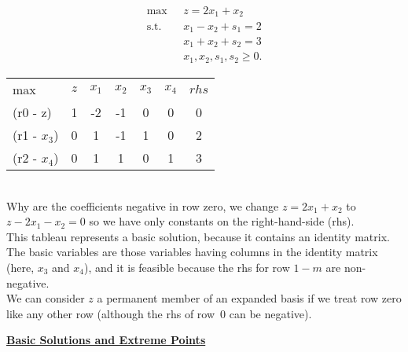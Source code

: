 \begin{minipage}[t][][b]{.4\linewidth} \vspace{-5mm}
\begin{align*}
\mbox{max~~} & z = 2x_1 + x_2  \\
\mbox{s.t.~~} & x_1 - x_2 +s_1 =  2  \\
& x_1 + x_2 +s_2  = 3 \\
& x_1, x_2, s_1 , s_2  \ge 0.
\end{align*}
\end{minipage}%
\begin{minipage}[t][][b]{.6\linewidth}
\begin{center} \begin{tabular} {l|c||c|c|c|c|c|}  \cline{2-7}
max & $z$	& $x_1$ & $x_2$  & $x_3$	& $x_4$	& $rhs$ \\ \cline{2-7}
(r0 - z)	    & 1		& -2        &  -1        &	 0 	    &	  0		&   0    \\ \cline{2-7}
(r1 - $x_3$)			& 0		&	 1        &     -1     &	 1 			&	  0 		&	  2   \\
(r2 - $x_4$)			& 0		&	  1       &	    1    &	 0 		&	  1 		&	   3   \\ \cline{2-7}
\end{tabular} \end{center}
\end{minipage} \\
 
\bigskip Why are the coefficients negative in row zero, we change $z = 2x_1 + x_2 $ to $z - 2x_1 - x_2 =0$ so we have only constants on the right-hand-side (rhs). \\

This tableau represents a basic solution, because it contains an identity matrix.  The basic variables are those variables having columns in the identity matrix (here, $x_3$ and $x_4$), and it is feasible because the rhs for row $1-m$ are non-negative. \\

We can consider $z$ a permanent member of an expanded basis if we treat row zero like any other row (although the rhs of row~0 can be negative).

\newpage \underline{\bf Basic Solutions and Extreme Points}

